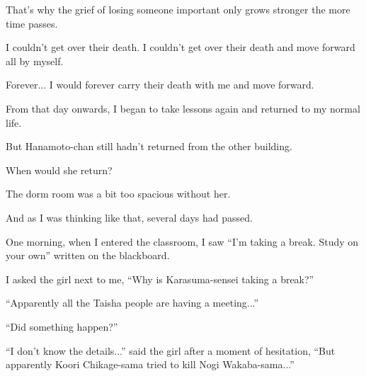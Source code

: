 That's why the grief of losing someone important only grows stronger the more time passes.

I couldn't get over their death. I couldn't get over their death and move forward all by myself.

Forever... I would forever carry their death with me and move forward.

From that day onwards, I began to take lessons again and returned to my normal life.

But Hanamoto-chan still hadn't returned from the other building.

When would she return?

The dorm room was a bit too spacious without her.

And as I was thinking like that, several days had passed.

One morning, when I entered the classroom, I saw ``I'm taking a break. Study on your own'' written on the blackboard.

I asked the girl next to me, ``Why is Karasuma-sensei taking a break?''

``Apparently all the Taisha people are having a meeting...''

``Did something happen?''

``I don't know the details...'' said the girl after a moment of hesitation, ``But apparently Koori Chikage-sama tried to kill Nogi Wakaba-sama...''
